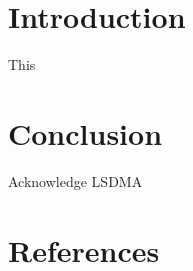 \documentclass[a4paper]{jpconf}
\begin{document}
\section{Introduction}

This\cite{rfc3230}


\section{Conclusion}

\ack

Acknowledge LSDMA

\section*{References}

\end{document}
